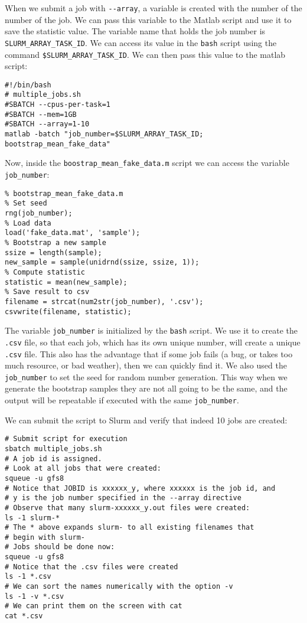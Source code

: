 \documentclass[12pt, a4paper]{article}
\begin{document}
When we submit a job with \texttt{-{}-array}, a variable is created with the number of the number of the job.
We can pass this variable to the Matlab script and use it to save the statistic value.
The variable name that holds the job number is \texttt{SLURM\_ARRAY\_TASK\_ID}.
We can access its value in the \texttt{bash} script using the command \texttt{\$SLURM\_ARRAY\_TASK\_ID}.
We can then pass this value to the matlab script:
\lstset{language=bash,label= ,caption= ,captionpos=b,firstnumber=1,numbers=left,style=bash}
\begin{lstlisting}
#!/bin/bash
# multiple_jobs.sh
#SBATCH --cpus-per-task=1
#SBATCH --mem=1GB
#SBATCH --array=1-10
matlab -batch "job_number=$SLURM_ARRAY_TASK_ID; bootstrap_mean_fake_data"
\end{lstlisting}
Now, inside the \texttt{boostrap\_mean\_fake\_data.m} script we can access the variable \texttt{job\_number}:
\lstset{language=matlab,label= ,caption= ,captionpos=b,firstnumber=1,numbers=left,style=Matlab-editor}
\begin{lstlisting}
% bootstrap_mean_fake_data.m
% Set seed
rng(job_number);
% Load data
load('fake_data.mat', 'sample');
% Bootstrap a new sample
ssize = length(sample);
new_sample = sample(unidrnd(ssize, ssize, 1));
% Compute statistic
statistic = mean(new_sample);
% Save result to csv
filename = strcat(num2str(job_number), '.csv');
csvwrite(filename, statistic);
\end{lstlisting}
The variable \texttt{job\_number} is initialized by the \texttt{bash} script.
We use it to create the \texttt{.csv} file, so that each job, which has its own unique number, will create a unique \texttt{.csv} file.
This also has the advantage that if some job fails (a bug, or takes too much resource, or bad weather), then we can quickly find it.
We also used the \texttt{job\_number} to set the seed for random number generation.
This way when we generate the bootstrap samples they are not all going to be the same, and the output will be repeatable if executed with the same \texttt{job\_number}.

We can submit the script to Slurm and verify that indeed 10 jobs are created:
\lstset{language=bash,label= ,caption= ,captionpos=b,firstnumber=1,numbers=left,style=bash}
\begin{lstlisting}
# Submit script for execution
sbatch multiple_jobs.sh
# A job id is assigned.
# Look at all jobs that were created:
squeue -u gfs8
# Notice that JOBID is xxxxxx_y, where xxxxxx is the job id, and
# y is the job number specified in the --array directive
# Observe that many slurm-xxxxxx_y.out files were created:
ls -1 slurm-*
# The * above expands slurm- to all existing filenames that
# begin with slurm-
# Jobs should be done now:
squeue -u gfs8
# Notice that the .csv files were created
ls -1 *.csv
# We can sort the names numerically with the option -v
ls -1 -v *.csv
# We can print them on the screen with cat
cat *.csv
\end{lstlisting}
\end{document}
